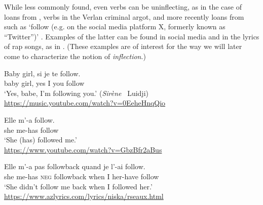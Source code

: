 \documentclass[output=paper,colorlinks,citecolor=brown]{langscibook}
\begin{document}
While less commonly found, even verbs can be uninflecting, as in the case of   loans from , verbs in the Verlan criminal argot, and more recently loans from  such as   `follow (e.g. on the social media platform X, formerly known as  ``Twitter'')' \citep{boye2019}. Examples of the latter can be found in social media and in the lyrics of  rap songs, as in . (These examples are of interest for the way we will later come to characterize the notion of \textit{inflection}.)

\ea\label{follow}
\begin{xlist}
	
	\ex\label{jetefollow}
	\gll	Baby girl, si je te follow. \\
	baby girl, yes I you follow \\
	\glt	`Yes, babe, I'm following you.' \hfill (\textit{Sirène} \textendash\ Luidji)\\ 
	\url{https://music.youtube.com/watch?v=0EeheHnqQio}					
	
	\ex\label{ellemafollow}
	\gll	
	Elle m'-a follow.	\\
	she me-has follow	\\
	\glt	`She (has) followed me.'	\\
	\url{https://www.youtube.com/watch?v=GbzBfr2aBus }						 
	
	\ex\label{followback}
	\gll	
	Elle m’-a pas followback quand je l’-ai follow.  \\
	she me-has \textsc{neg} followback when I her-have follow\\
	\glt		`She didn't follow me back when I followed her.'	\\ 
	\url{https://www.azlyrics.com/lyrics/niska/rseaux.html} 							
\end{xlist}
\z
\end{document}

